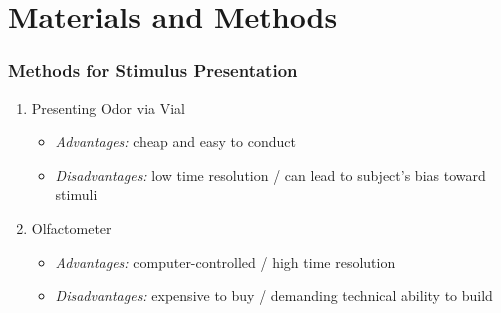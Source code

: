 \documentclass{beamer}
\begin{document}
\section{Materials and Methods} 

\begin{frame}
	\frametitle{Methods for Stimulus Presentation}
	\begin{enumerate}
		\item
		Presenting Odor via Vial
		\begin{itemize}
			\item
			\textit{Advantages:} cheap and easy to conduct
			\item
			\textit{Disadvantages:} low time resolution / can lead to subject's bias toward stimuli		
		\end{itemize}
		\item
		Olfactometer
		\begin{itemize}
			\item
			\textit{Advantages:} computer-controlled / high time resolution
			\item
			\textit{Disadvantages:} expensive to buy / demanding technical ability to build
		\end{itemize}

	\end{enumerate}
\end{frame}
\end{document}
